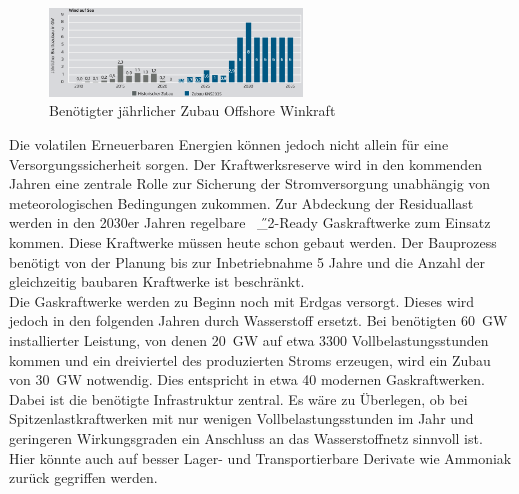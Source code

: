 				\begin{figure}[H]
				\centering
				\includegraphics[page=1, clip, width=0.6\textwidth]{./anhang/Zubau Offshore Agora2035.png}
				\caption{Benötigter jährlicher Zubau Offshore Winkraft}
				\label{Abb.Zubau Offshore Agora2035}
			\end{figure}
		Die volatilen Erneuerbaren Energien können jedoch nicht allein für eine Versorgungssicherheit sorgen. Der Kraftwerksreserve wird in den kommenden Jahren eine zentrale Rolle zur Sicherung der Stromversorgung unabhängig von meteorologischen Bedingungen zukommen. Zur Abdeckung der Residuallast werden in den 2030er Jahren regelbare \SI{}{\H{_2}}-Ready Gaskraftwerke zum Einsatz kommen. Diese Kraftwerke müssen heute schon gebaut werden. Der Bauprozess benötigt von der Planung bis zur Inbetriebnahme 5 Jahre und die Anzahl der gleichzeitig baubaren Kraftwerke ist beschränkt.\\
		Die Gaskraftwerke werden zu Beginn noch mit Erdgas versorgt. Dieses wird jedoch in den folgenden Jahren durch Wasserstoff ersetzt. Bei benötigten \SI{60}{\giga \watt} installierter Leistung, von denen \SI{20}{\giga \watt} auf etwa 3300 Vollbelastungsstunden kommen und ein dreiviertel des produzierten Stroms erzeugen, wird ein Zubau von \SI{30}{\giga \watt} notwendig. Dies entspricht in etwa 40 modernen Gaskraftwerken. Dabei ist die benötigte Infrastruktur zentral. Es wäre zu Überlegen, ob bei Spitzenlastkraftwerken mit nur wenigen Vollbelastungsstunden im Jahr und geringeren Wirkungsgraden ein Anschluss an das Wasserstoffnetz sinnvoll ist. Hier könnte auch auf besser Lager- und Transportierbare Derivate wie Ammoniak zurück gegriffen werden.\\
		
